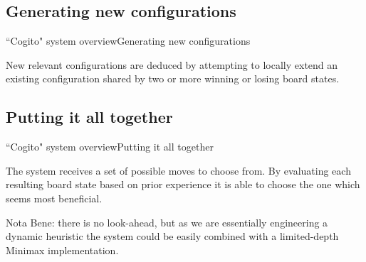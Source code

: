\subsection{Generating new configurations}
\begin{frame}{``Cogito" system overview}{Generating new configurations}

New relevant configurations are deduced by attempting to locally extend an 
existing configuration shared by two or more winning or losing board states.

\end{frame}

\subsection{Putting it all together}
\begin{frame}{``Cogito" system overview}{Putting it all together}

The system receives a set of possible moves to choose from. By evaluating each 
resulting board state based on prior experience it is able to choose the one 
which seems most beneficial.

Nota Bene: there is no look-ahead, but as we are essentially engineering a 
dynamic heuristic the system could be easily combined with a limited-depth 
Minimax implementation.

\end{frame}